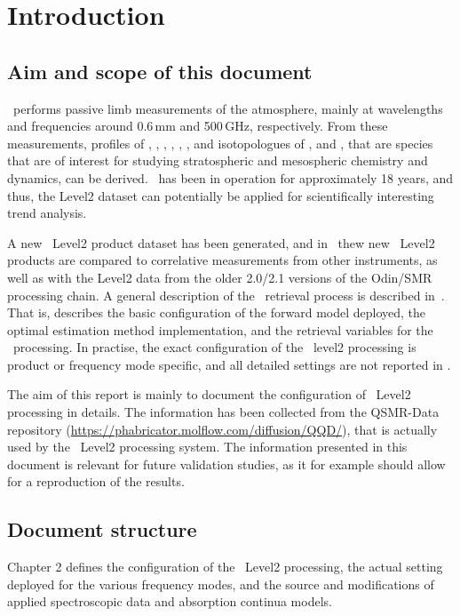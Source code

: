 \chapter{Introduction}
\label{chapter:introduction}


\setcounter{page}{1}


\section{Aim and scope of this document}
\label{sec:aim}
\smr\ performs passive limb measurements of the atmosphere,
mainly at wavelengths and frequencies around 0.6\,mm and 500\,GHz,
respectively.
From these measurements, profiles of 
, , , , 
, , and isotopologues of , and ,
that are species that are of interest for studying stratospheric and 
mesospheric chemistry and dynamics, can be derived. 
\smr\ has been in operation for approximately 18 years, and thus, the Level2
dataset can potentially be applied for scientifically interesting trend analysis.

A new \smr\ Level2 product dataset has been generated, and in~\cite{dds}
thew new \smr\ Level2 products are compared to correlative measurements from other
instruments, as well as with the Level2 data from the older 2.0/2.1 versions of
the Odin/SMR processing chain. A general description
of the \smr\ retrieval process is described in~\cite{atbdl2}. That is, 
\cite{atbdl2} describes the basic configuration of the forward
model deployed, the optimal estimation method implementation, and the retrieval
variables for the \smr\ processing. In practise, the exact configuration
of the \smr\ level2 processing is product or frequency mode specific,
and all detailed settings are not reported in \cite{atbdl2}.

The aim of this report is mainly to document the configuration of \smr\ Level2 processing
in details. The information has been collected from the QSMR-Data repository
(\url{https://phabricator.molflow.com/diffusion/QQD/}), that is actually used
by the \smr\ Level2 processing system. 
The information presented in this document is relevant for future validation studies,
as it for example should allow for a reproduction of the results.
 

\section{Document structure}

Chapter 2 defines the configuration of the \smr\ Level2
processing, the actual setting deployed for the various
frequency modes, and the source and modifications of
applied spectroscopic data and absorption continua models.
